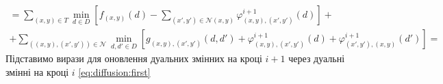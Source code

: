 \begin{equation*}
\begin{gathered}
    = \sum \limits_{\left(x, y \right) \in T}
        \min \limits_{d \in D} \left[
            f_{\left(x, y \right)} \left( d \right) -
            \sum \limits_{\left(x', y' \right) \in \mathcal{N} \left(x, y \right)}
                \varphi_{\left(x, y \right), \left(x', y' \right)}^{i + 1}
                    \left( d \right)
        \right] + \\
    + \sum \limits_{\left(\left(x, y \right), \left(x', y' \right) \right) \in \mathcal{N}}
        \min \limits_{d, d' \in D} \left[
            g_{\left(x, y \right), \left(x', y' \right)} \left(d, d' \right) +
            \varphi_{\left(x, y \right), \left(x', y' \right)}^{i + 1}
                \left( d \right) +
            \varphi_{\left(x', y' \right), \left(x, y \right)}^{i + 1}
                \left( d' \right)
        \right] =
\end{gathered}
\end{equation*}
Підставимо вирази для оновлення дуальних змінних на кроці $i + 1$
через дуальні змінні на кроці $i$ \eqref{eq:diffusion:first}

